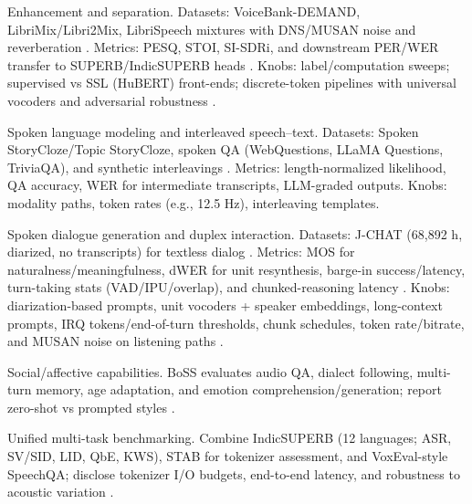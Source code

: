 \documentclass{article}
\begin{document}
Enhancement and separation. Datasets: VoiceBank-DEMAND, LibriMix/Libri2Mix, LibriSpeech mixtures with DNS/MUSAN noise and reverberation \cite{bai2025dmelspeechtokenizationmadesimple,messica2024nastnoiseawarespeechtokenizationlanguage}. Metrics: PESQ, STOI, SI-SDRi, and downstream PER/WER transfer to SUPERB/IndicSUPERB heads \cite{entry2025indicsuperbspeechprocessinguniversalperf}. Knobs: label/computation sweeps; supervised vs SSL (HuBERT) front-ends; discrete-token pipelines with universal vocoders and adversarial robustness \cite{chen2023reducingbarriersselfsupervisedlearninghu,mousavi2024howshouldweextractdiscreteaudiotokenssel,djanibekov2025spiritpatchingspeechlanguagemodelsagains}.

Spoken language modeling and interleaved speech--text. Datasets: Spoken StoryCloze/Topic StoryCloze, spoken QA (WebQuestions, LLaMA Questions, TriviaQA), and synthetic interleavings \cite{zeng2024scalingspeechtextpretrainingsyntheticint}. Metrics: length-normalized likelihood, QA accuracy, WER for intermediate transcripts, LLM-graded outputs. Knobs: modality paths, token rates (e.g., 12.5 Hz), interleaving templates.

Spoken dialogue generation and duplex interaction. Datasets: J-CHAT (68,892 h, diarized, no transcripts) for textless dialog \cite{nakata2024jchatjapaneselargescalespokendialoguecor}. Metrics: MOS for naturalness/meaningfulness, dWER for unit resynthesis, barge-in success/latency, turn-taking stats (VAD/IPU/overlap), and chunked-reasoning latency \cite{chiang2025stitchsimultaneousthinkingtalkingchunked}. Knobs: diarization-based prompts, unit vocoders + speaker embeddings, long-context prompts, IRQ tokens/end-of-turn thresholds, chunk schedules, token rate/bitrate, and MUSAN noise on listening paths \cite{li2025continuousspeechtokenizertext,vashishth2024stabspeechtokenizerassessmentbenchmark}.

Social/affective capabilities. BoSS evaluates audio QA, dialect following, multi-turn memory, age adaptation, and emotion comprehension/generation; report zero-shot vs prompted styles \cite{wang2025bossbeyondsemanticspeech}.

Unified multi-task benchmarking. Combine IndicSUPERB (12 languages; ASR, SV/SID, LID, QbE, KWS), STAB for tokenizer assessment, and VoxEval-style SpeechQA; disclose tokenizer I/O budgets, end-to-end latency, and robustness to acoustic variation \cite{vashishth2024stabspeechtokenizerassessmentbenchmark,cui2025voxevalbenchmarkingknowledgeunderstandin,maimon2025salmonsuiteacousticlanguagemodelevaluati}.
\end{document}
